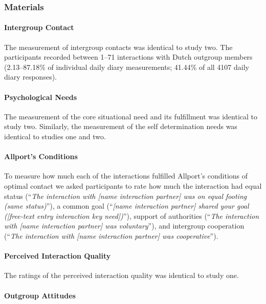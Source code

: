 \subsubsection{Materials}

\paragraph{Intergroup Contact}

The measurement of intergroup contacts was identical to study two. The
participants recorded between 1--71 interactions with Dutch outgroup
members (2.13--87.18\% of individual daily diary measurements; 41.44\%
of all 4107 daily diary responses).

\paragraph{Psychological Needs}

The measurement of the core situational need and its fulfillment was
identical to study two. Similarly, the measurement of the self
determination needs was identical to studies one and two.

\paragraph{Allport's Conditions}

To measure how much each of the interactions fulfilled Allport's
conditions of optimal contact we asked participants to rate how much the
interaction had equal status
(``\textit{The interaction with [name interaction partner] was on equal footing (same status)}''),
a common goal
(``\textit{[name interaction partner] shared your goal ([free-text entry interaction key need])}''),
support of authorities
(``\textit{The interaction with [name interaction partner] was voluntary}''),
and intergroup cooperation
(``\textit{The interaction with [name interaction partner] was cooperative}'').

\paragraph{Perceived Interaction Quality}

The ratings of the perceived interaction quality was identical to study
one.

\paragraph{Outgroup Attitudes}


